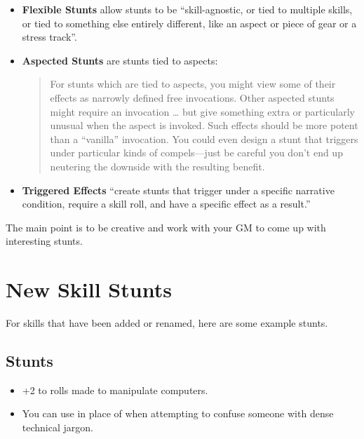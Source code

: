 \documentclass[12pt,titlepage,openany]{book}
\begin{document}
\begin{itemize}
    \item \textbf{Flexible Stunts} allow stunts to be ``skill-agnostic, or tied
        to multiple skills, or tied to something else entirely different, like
        an aspect or piece of gear or a stress track''.

    \item \textbf{Aspected Stunts} are stunts tied to aspects:
        \begin{quote}
            For stunts which are tied to aspects, you might view some of their
            effects as narrowly defined free invocations. Other aspected stunts
            might require an invocation \ldots{} but give something extra or
            particularly unusual when the aspect is invoked. Such effects
            should be more potent than a ``vanilla'' invocation. You could even
            design a stunt that triggers under particular kinds of
            compels---just be careful you don’t end up neutering the downside
            with the resulting benefit.
        \end{quote}

    \item \textbf{Triggered Effects} ``create stunts that trigger under a
        specific narrative condition, require a skill roll, and have a specific
        effect as a result.''
\end{itemize}

\noindent
The main point is to be creative and work with your GM to come up with
interesting stunts.

\section{New Skill Stunts}\label{sec:skill-stunts}
For skills that have been added or renamed, here are some example stunts.

\subsection*{ Stunts}\label{subsec:academics-stunts}
\begin{itemize}
    \item {} +2 to  rolls made to
        manipulate computers.
    \item {} You can use  in place of
         when attempting to confuse someone with dense technical
        jargon.
\end{itemize}
\end{document}
